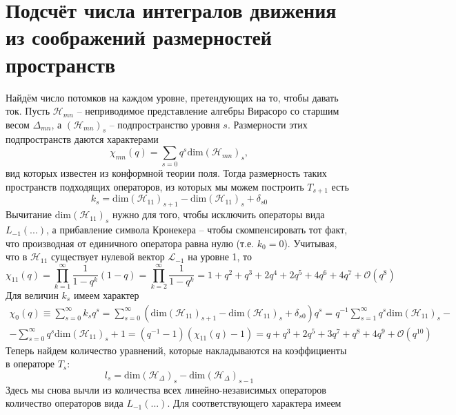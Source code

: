 \documentclass[12pt]{article}
\theoremstyle{definition}
\begin{document}
\section{Подсчёт числа интегралов движения из соображений размерностей пространств}
Найдём число потомков на каждом уровне, претендующих на то, чтобы давать ток. Пусть $\mathcal{H}_{mn}$ -- неприводимое представление алгебры Вирасоро со старшим весом $\Delta_{mn}$, а $(\mathcal{H}_{mn})_s$ -- подпространство уровня $s$. Размерности этих подпространств даются характерами
\begin{equation}
    \chi_{mn}(q)=\sum\limits_{s=0}q^s\text{dim}(\mathcal{H}_{mn})_s,
\end{equation}
вид которых известен из конформной теории поля. Тогда размерность таких пространств подходящих операторов, из которых мы можем построить $T_{s+1}$ есть
\begin{equation}
    k_s=\text{dim}(\mathcal{H}_{11})_{s+1}-\text{dim}(\mathcal{H}_{11})_s+\delta_{s0}
\end{equation}
Вычитание $\text{dim}(\mathcal{H}_{11})_s$ нужно для того, чтобы исключить операторы вида $L_{-1}(...)$, а прибавление символа Кронекера -- чтобы скомпенсировать тот факт, что производная от единичного оператора равна нулю (т.е. $k_0=0$). Учитывая, что в $\mathcal{H}_{11}$ существует нулевой вектор $\mathcal{L}_{-1}$ на уровне 1, то
\begin{equation}
    \chi_{11}(q)=\prod\limits_{k=1}^\infty\frac{1}{1-q^k}(1-q)=\prod\limits_{k=2}^\infty\frac{1}{1-q^k}=1+q^2+q^3+2q^4+2q^5+4q^6+4q^7+\mathcal{O}(q^8)
\end{equation}
Для величин $k_s$ имеем характер
\begin{multline}
    \chi_0(q)\equiv\sum\limits_{s=0}^\infty k_sq^s=\sum\limits_{s=0}^\infty(\text{dim}(\mathcal{H}_{11})_{s+1}-\text{dim}(\mathcal{H}_{11})_s+\delta_{s0})q^s=q^{-1}\sum\limits_{s=1}^\infty q^s\text{dim}(\mathcal{H}_{11})_s-\\-\sum\limits_{s=0}^\infty q^s\text{dim}(\mathcal{H}_{11})_s+1=(q^{-1}-1)(\chi_{11}(q)-1)=q+q^3+2q^5+3q^7+q^8+4q^9+\mathcal{O}(q^{10})
\end{multline}
Теперь найдем количество уравнений, которые накладываются на коэффициенты в операторе $T_s$:
\begin{equation}
    l_s=\text{dim}(\mathcal{H}_\Delta)_s-\text{dim}(\mathcal{H}_\Delta)_{s-1}
\end{equation}
Здесь мы снова вычли из количества всех линейно-независимых операторов количество операторов вида $L_{-1}(...)$. Для соответствующего характера имеем
\end{document}
